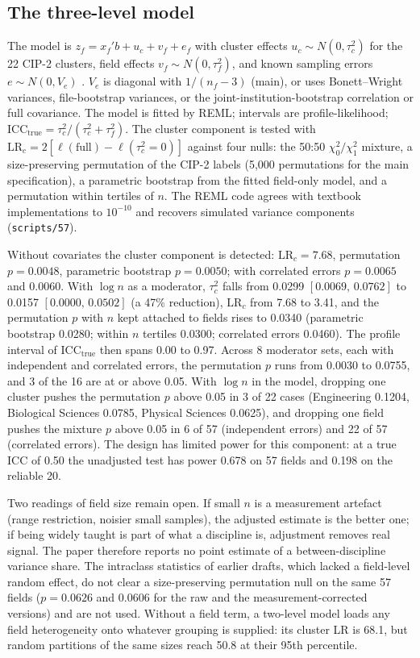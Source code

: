 \documentclass[11pt]{article}
\newcommand{\ci}[2]{$[#1,\allowbreak\,#2]$}
\newcommand{\scr}[1]{\texttt{scripts/#1}}
\begin{document}
\subsection{The three-level model}\label{sec:threelevel}

The model is $z_f=x_f'b+u_c+v_f+e_f$ with cluster effects $u_c\sim N(0,\tau^2_c)$ for the 22 CIP-2 clusters,
field effects $v_f\sim N(0,\tau^2_f)$, and known sampling errors $e\sim N(0,V_e)$
\citep{konstantopoulos2011fixed,cheung2014modeling}. $V_e$ is diagonal with $1/(n_f-3)$ (main), or uses
Bonett--Wright variances, file-bootstrap variances, or the joint-institution-bootstrap correlation or full
covariance. The model is fitted by REML; intervals are profile-likelihood; $\text{ICC}_{\text{true}}=
\tau^2_c/(\tau^2_c+\tau^2_f)$. The cluster component is tested with $\text{LR}_c=2[\ell(\text{full})-
\ell(\tau^2_c=0)]$ against four nulls: the 50:50 $\chi^2_0/\chi^2_1$ mixture, a size-preserving permutation of
the CIP-2 labels (5,000 permutations for the main specification), a parametric bootstrap from the fitted
field-only model, and a permutation within tertiles of $n$. The REML code agrees with textbook implementations
to $10^{-10}$ and recovers simulated variance components (\scr{57}).

Without covariates the cluster component is detected: $\text{LR}_c=7.68$, permutation $p=0.0048$, parametric
bootstrap $p=0.0050$; with correlated errors $p=0.0065$ and $0.0060$. With $\log n$ as a moderator, $\tau^2_c$
falls from 0.0299 \ci{0.0069}{0.0762} to 0.0157 \ci{0.0000}{0.0502} (a 47\% reduction), $\text{LR}_c$ from 7.68
to 3.41, and the permutation $p$ with $n$ kept attached to fields rises to 0.0340 (parametric bootstrap 0.0280;
within $n$ tertiles 0.0300; correlated errors 0.0460). The profile interval of $\text{ICC}_{\text{true}}$ then
spans 0.00 to 0.97. Across 8 moderator sets, each with independent and correlated errors, the permutation $p$
runs from 0.0030 to 0.0755, and 3 of the 16 are at or above 0.05. With $\log n$ in the model, dropping one
cluster pushes the permutation $p$ above 0.05 in 3 of 22 cases (Engineering 0.1204, Biological Sciences 0.0785,
Physical Sciences 0.0625), and dropping one field pushes the mixture $p$ above 0.05 in 6 of 57 (independent
errors) and 22 of 57 (correlated errors). The design has limited power for this component: at a true ICC of
0.50 the unadjusted test has power 0.678 on 57 fields and 0.198 on the reliable 20.

Two readings of field size remain open. If small $n$ is a measurement artefact (range restriction, noisier
small samples), the adjusted estimate is the better one; if being widely taught is part of what a discipline
is, adjustment removes real signal. The paper therefore reports no point estimate of a between-discipline
variance share. The
intraclass statistics of earlier drafts, which lacked a field-level random effect, do not clear a
size-preserving permutation null on the same 57 fields ($p=0.0626$ and $0.0606$ for the raw and the
measurement-corrected versions) and are not used. Without a field term, a two-level model loads any field
heterogeneity onto whatever grouping is supplied: its cluster LR is 68.1, but random partitions of the same
sizes reach 50.8 at their 95th percentile.
\end{document}
